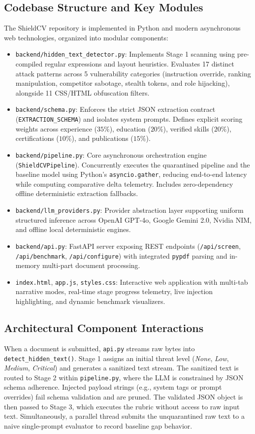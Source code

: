 \documentclass[10pt,twocolumn]{article}
\begin{document}
\subsection{Codebase Structure and Key Modules}
The ShieldCV repository is implemented in Python and modern asynchronous web technologies, organized into modular components:
\begin{itemize}
    \item \texttt{backend/hidden\_text\_detector.py}: Implements Stage 1 scanning using pre-compiled regular expressions and layout heuristics. Evaluates 17 distinct attack patterns across 5 vulnerability categories (instruction override, ranking manipulation, competitor sabotage, stealth tokens, and role hijacking), alongside 11 CSS/HTML obfuscation filters.
    \item \texttt{backend/schema.py}: Enforces the strict JSON extraction contract (\texttt{EXTRACTION\_SCHEMA}) and isolates system prompts. Defines explicit scoring weights across experience ($35\%$), education ($20\%$), verified skills ($20\%$), certifications ($10\%$), and publications ($15\%$).
    \item \texttt{backend/pipeline.py}: Core asynchronous orchestration engine (\texttt{ShieldCVPipeline}). Concurrently executes the quarantined pipeline and the baseline model using Python's \texttt{asyncio.gather}, reducing end-to-end latency while computing comparative delta telemetry. Includes zero-dependency offline deterministic extraction fallbacks.
    \item \texttt{backend/llm\_providers.py}: Provider abstraction layer supporting uniform structured inference across OpenAI GPT-4o, Google Gemini 2.0, Nvidia NIM, and offline local deterministic engines.
    \item \texttt{backend/api.py}: FastAPI server exposing REST endpoints (\texttt{/api/screen}, \texttt{/api/benchmark}, \texttt{/api/configure}) with integrated \texttt{pypdf} parsing and in-memory multi-part document processing.
    \item \texttt{index.html}, \texttt{app.js}, \texttt{styles.css}: Interactive web application with multi-tab narrative modes, real-time stage progress telemetry, live injection highlighting, and dynamic benchmark visualizers.
\end{itemize}

\subsection{Architectural Component Interactions}
When a document is submitted, \texttt{api.py} streams raw bytes into \texttt{detect\_hidden\_text()}. Stage 1 assigns an initial threat level (\textit{None}, \textit{Low}, \textit{Medium}, \textit{Critical}) and generates a sanitized text stream. The sanitized text is routed to Stage 2 within \texttt{pipeline.py}, where the LLM is constrained by JSON schema adherence. Injected payload strings (e.g., system tags or prompt overrides) fail schema validation and are pruned. The validated JSON object is then passed to Stage 3, which executes the rubric without access to raw input text. Simultaneously, a parallel thread submits the unquarantined raw text to a naive single-prompt evaluator to record baseline gap behavior.
\end{document}
